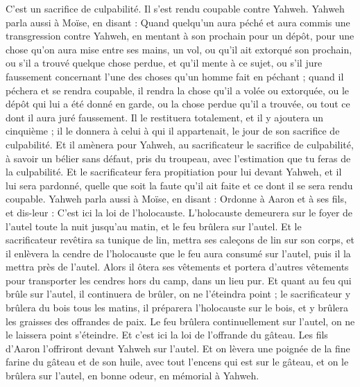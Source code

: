 \begin{multicols}{2}
C'est un sacrifice de culpabilité. Il s'est rendu coupable contre Yahweh.
Yahweh parla aussi à Moïse, en disant :
Quand quelqu'un aura péché et aura commis une transgression contre Yahweh, en mentant à son prochain pour un dépôt, pour une chose qu'on aura mise entre ses mains, un vol, ou qu'il ait extorqué son prochain,
ou s'il a trouvé quelque chose perdue, et qu'il mente à ce sujet, ou s'il jure faussement concernant l'une des choses qu'un homme fait en péchant ;
quand il péchera et se rendra coupable, il rendra la chose qu'il a volée ou extorquée, ou le dépôt qui lui a été donné en garde, ou la chose perdue qu'il a trouvée,
ou tout ce dont il aura juré faussement. Il le restituera totalement, et il y ajoutera un cinquième ; il le donnera à celui à qui il appartenait, le jour de son sacrifice de culpabilité.
Et il amènera pour Yahweh, au sacrificateur le sacrifice de culpabilité, à savoir un bélier sans défaut, pris du troupeau, avec l'estimation que tu feras de la culpabilité.
Et le sacrificateur fera propitiation pour lui devant Yahweh, et il lui sera pardonné, quelle que soit la faute qu'il ait faite et ce dont il se sera rendu coupable.
\VerseOne{}Yahweh parla aussi à Moïse, en disant :
Ordonne à Aaron et à ses fils, et dis-leur : C'est ici la loi de l'holocauste. L'holocauste demeurera sur le foyer de l'autel toute la nuit jusqu'au matin, et le feu brûlera sur l'autel.
Et le sacrificateur revêtira sa tunique de lin, mettra ses caleçons de lin sur son corps, et il enlèvera la cendre de l'holocauste que le feu aura consumé sur l'autel, puis il la mettra près de l'autel.
Alors il ôtera ses vêtements et portera d'autres vêtements pour transporter les cendres hors du camp, dans un lieu pur.
Et quant au feu qui brûle sur l'autel, il continuera de brûler, on ne l'éteindra point ; le sacrificateur y brûlera du bois tous les matins, il préparera l'holocauste sur le bois, et y brûlera les graisses des offrandes de paix.
Le feu brûlera continuellement sur l'autel, on ne le laissera point s'éteindre.
Et c'est ici la loi de l'offrande du gâteau. Les fils d'Aaron l'offriront devant Yahweh sur l'autel.
Et on lèvera une poignée de la fine farine du gâteau et de son huile, avec tout l'encens qui est sur le gâteau, et on le brûlera sur l'autel, en bonne odeur, en mémorial à Yahweh.

\end{multicols}
